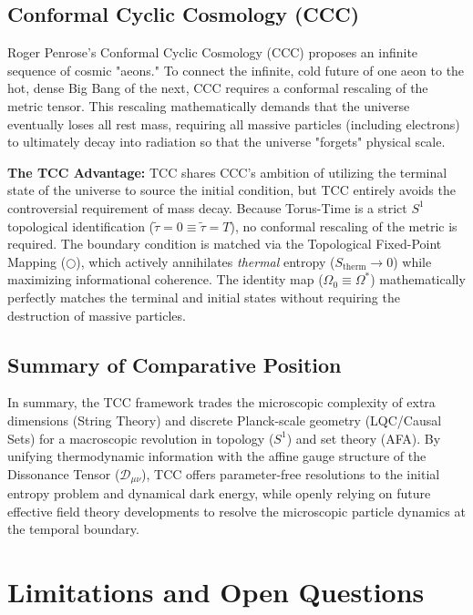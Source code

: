 \documentclass[12pt,openany]{book}
\theoremstyle{plain}
\theoremstyle{definition}
\theoremstyle{remark}
\begin{document}
\section{Conformal Cyclic Cosmology (CCC)}

Roger Penrose's Conformal Cyclic Cosmology (CCC) \cite{penrose2010} proposes an infinite sequence of cosmic "aeons." To connect the infinite, cold future of one aeon to the hot, dense Big Bang of the next, CCC requires a conformal rescaling of the metric tensor. This rescaling mathematically demands that the universe eventually loses all rest mass, requiring all massive particles (including electrons) to ultimately decay into radiation so that the universe "forgets" physical scale.

\textbf{The TCC Advantage:} TCC shares CCC's ambition of utilizing the terminal state of the universe to source the initial condition, but TCC entirely avoids the controversial requirement of mass decay. Because Torus-Time is a strict $S^1$ topological identification ($\tilde{\tau} = 0 \equiv \tilde{\tau} = T$), no conformal rescaling of the metric is required. The boundary condition is matched via the Topological Fixed-Point Mapping ($\bigcirc$), which actively annihilates \emph{thermal} entropy ($S_{\text{therm}} \to 0$) while maximizing informational coherence. The identity map ($\Omega_0 \equiv \Omega^*$) mathematically perfectly matches the terminal and initial states without requiring the destruction of massive particles.

\section{Summary of Comparative Position}

In summary, the TCC framework trades the microscopic complexity of extra dimensions (String Theory) and discrete Planck-scale geometry (LQC/Causal Sets) for a macroscopic revolution in topology ($S^1$) and set theory (AFA). By unifying thermodynamic information with the affine gauge structure of the Dissonance Tensor ($\mathcal{D}_{\mu\nu}$), TCC offers parameter-free resolutions to the initial entropy problem and dynamical dark energy, while openly relying on future effective field theory developments to resolve the microscopic particle dynamics at the temporal boundary.

\chapter{Limitations and Open Questions}
\end{document}
